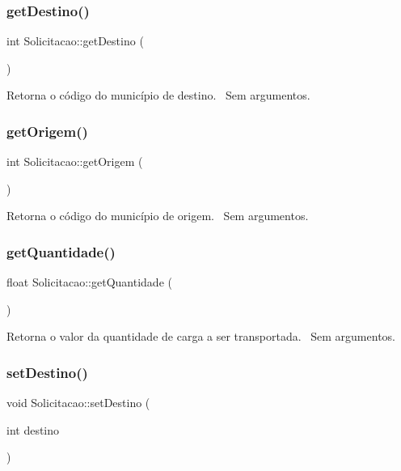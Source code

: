 \subsubsection{\texorpdfstring{get\+Destino()}{getDestino()}}
{\footnotesize\ttfamily int Solicitacao\+::get\+Destino (\begin{DoxyParamCaption}{ }\end{DoxyParamCaption})}

Retorna o código do município de destino.~\newline
Sem argumentos.\mbox{\label{classSolicitacao_a53a5b37dd6aca895d84ef9991fc7775b}} 
\subsubsection{\texorpdfstring{get\+Origem()}{getOrigem()}}
{\footnotesize\ttfamily int Solicitacao\+::get\+Origem (\begin{DoxyParamCaption}{ }\end{DoxyParamCaption})}

Retorna o código do município de origem.~\newline
Sem argumentos.\mbox{\label{classSolicitacao_a7e936983b3b1c6d4010649edcbac4819}} 
\subsubsection{\texorpdfstring{get\+Quantidade()}{getQuantidade()}}
{\footnotesize\ttfamily float Solicitacao\+::get\+Quantidade (\begin{DoxyParamCaption}{ }\end{DoxyParamCaption})}

Retorna o valor da quantidade de carga a ser transportada.~\newline
Sem argumentos.\mbox{\label{classSolicitacao_ac772a2517a1d395f1a541424d29716cd}} 
\subsubsection{\texorpdfstring{set\+Destino()}{setDestino()}}
{\footnotesize\ttfamily void Solicitacao\+::set\+Destino (\begin{DoxyParamCaption}\item[{int}]{destino }\end{DoxyParamCaption})}

